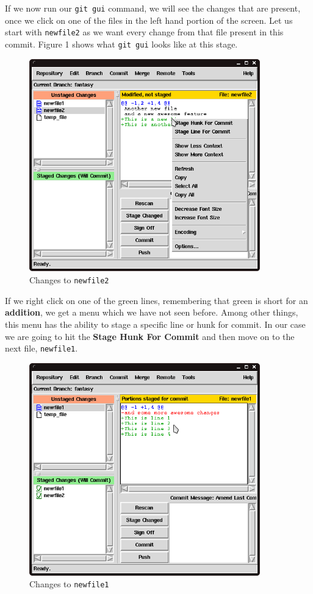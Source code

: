 If we now run our \texttt{git gui} command, we will see the changes that are present, once we click on one of the files in the left hand portion of the screen.
Let us start with \texttt{newfile2} as we want every change from that file present in this commit.
Figure 1 shows what \texttt{git gui} looks like at this stage.

\begin{figure}[hbt]
\centering
\includegraphics[width=10cm]{images/f-af5-d1.png}
\caption{Changes to \texttt{newfile2}}
\end{figure}

If we right click on one of the green lines, remembering that green is short for an \textbf{addition}, we get a menu which we have not seen before.
Among other things, this menu has the ability to stage a specific line or hunk for commit.
In our case we are going to hit the \textbf{Stage Hunk For Commit} and then move on to the next file, \texttt{newfile1}.

\begin{figure}[hbt]
\centering
\includegraphics[width=10cm]{images/f-af5-d2.png}
\caption{Changes to \texttt{newfile1}}
\end{figure}

